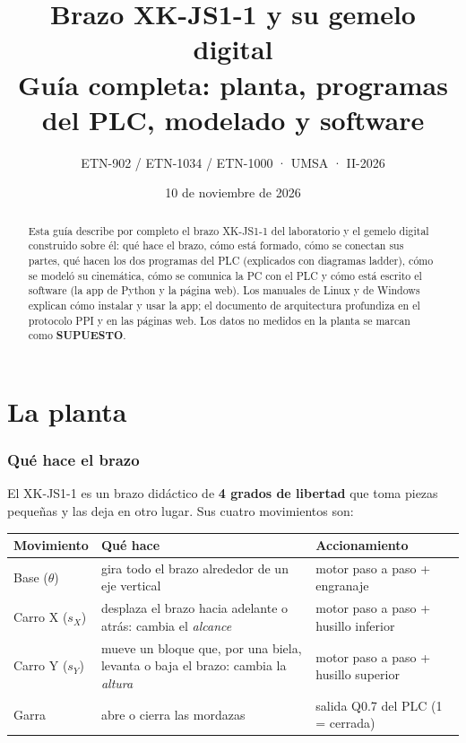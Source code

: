 \documentclass[a4paper,11pt]{article}
\title{\textbf{Brazo XK-JS1-1 y su gemelo digital}\\[4pt]\large Guía completa: planta, programas del PLC, modelado y software}
\author{ETN-902 / ETN-1034 / ETN-1000 · UMSA · II-2026}
\date{10 de noviembre de 2026}
\begin{document}
\maketitle
\thispagestyle{fancy}

\begin{abstract}
Esta guía describe por completo el brazo XK-JS1-1 del laboratorio y el gemelo digital construido sobre él: qué hace el brazo, cómo está formado, cómo se conectan sus partes, qué hacen los dos programas del PLC (explicados con diagramas ladder), cómo se modeló su cinemática, cómo se comunica la PC con el PLC y cómo está escrito el software (la app de Python y la página web). Los manuales de Linux y de Windows explican cómo instalar y usar la app; el documento de arquitectura profundiza en el protocolo PPI y en las páginas web. Los datos no medidos en la planta se marcan como \textbf{SUPUESTO}.
\end{abstract}

\tableofcontents
\newpage

\part{La planta}

\section{Qué hace el brazo}

El XK-JS1-1 es un brazo didáctico de \textbf{4 grados de libertad} que toma piezas pequeñas y las deja en otro lugar. Sus cuatro movimientos son:

\begin{center}\small
\begin{tabularx}{\linewidth}{>{\raggedright}p{2.6cm} >{\raggedright}X >{\raggedright\arraybackslash}p{4.6cm}}
\toprule
\textbf{Movimiento} & \textbf{Qué hace} & \textbf{Accionamiento}\\
\midrule
Base ($\theta$) & gira todo el brazo alrededor de un eje vertical & motor paso a paso + engranaje\\
Carro X ($s_X$) & desplaza el brazo hacia adelante o atrás: cambia el \emph{alcance} & motor paso a paso + husillo inferior\\
Carro Y ($s_Y$) & mueve un bloque que, por una biela, levanta o baja el brazo: cambia la \emph{altura} & motor paso a paso + husillo superior\\
Garra & abre o cierra las mordazas & salida Q0.7 del PLC (1 = cerrada)\\
\bottomrule
\end{tabularx}
\end{center}
\end{document}
